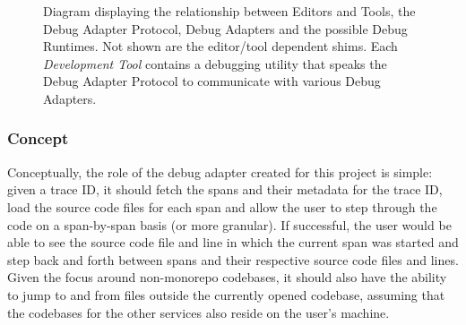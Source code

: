 \documentclass[12pt,pdftex,titlepage]{report}
\begin{document}
                    \begin{figure}[hbt!]
                        \centering
                        \caption{Diagram displaying the relationship between Editors and Tools, the Debug Adapter Protocol, Debug Adapters and the possible Debug Runtimes. Not shown are the
                            editor/tool dependent shims. Each \textit{Development Tool} contains a debugging utility that speaks the Debug Adapter Protocol to communicate with various Debug
                            Adapters.}
                        \label{fig:debug-arch}
                    \end{figure}

                \subsubsection{Concept}
                    Conceptually, the role of the debug adapter created for this project is simple: given a trace ID, it should fetch the spans and their metadata for the trace ID, load the 
                    source code files for each span and allow the user to step through the code on a span-by-span basis (or more granular). If successful, the user would be able to see the
                    source code file and line in which the current span was started and step back and forth between spans and their respective source code files and lines. Given the focus
                    around non-monorepo codebases, it should also have the ability to jump to and from files outside the currently opened codebase, assuming that the codebases for the other 
                    services also reside on the user's machine.
                    
\end{document}
